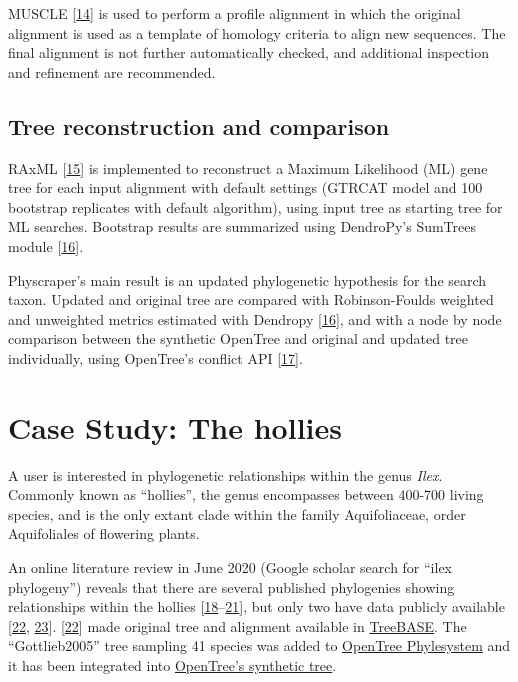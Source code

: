 \documentclass[]{article}
\begin{document}
MUSCLE {[}\protect\hyperlink{ref-edgar2004muscle}{14}{]} is used to perform a profile alignment in which the original alignment is used as a template of homology criteria to align new sequences.
The final alignment is not further automatically checked, and additional inspection and refinement are recommended.

\hypertarget{tree-reconstruction-and-comparison}{%
\subsection{Tree reconstruction and comparison}\label{tree-reconstruction-and-comparison}}

RAxML {[}\protect\hyperlink{ref-stamatakis2014raxml}{15}{]} is implemented to reconstruct a Maximum Likelihood (ML) gene tree for each input alignment with default settings (GTRCAT model and 100 bootstrap replicates with default algorithm), using input tree as starting tree for ML searches.
Bootstrap results are summarized using DendroPy's SumTrees module {[}\protect\hyperlink{ref-sukumaran2010dendropy}{16}{]}.

Physcraper's main result is an updated phylogenetic hypothesis for the search taxon.
Updated and original tree are compared with Robinson-Foulds weighted and unweighted metrics estimated with Dendropy {[}\protect\hyperlink{ref-sukumaran2010dendropy}{16}{]}, and with a node by node comparison between the synthetic OpenTree and original and updated tree individually, using OpenTree's conflict API {[}\protect\hyperlink{ref-redelings2017supertree}{17}{]}.

\hypertarget{case-study-the-hollies}{%
\section{Case Study: The hollies}\label{case-study-the-hollies}}

A user is interested in phylogenetic relationships within the genus \emph{Ilex}. Commonly known as ``hollies'', the genus encompasses between 400-700 living species, and is the only extant clade within the family Aquifoliaceae, order Aquifoliales of flowering plants.

An online literature review in June 2020 (Google scholar search for ``ilex phylogeny'') reveals that there are several published phylogenies showing relationships within the hollies {[}\protect\hyperlink{ref-cuenoud2000molecular}{18}--\protect\hyperlink{ref-selbach2009new}{21}{]}, but only two have data publicly available {[}\protect\hyperlink{ref-gottlieb2005molecular}{22}, \protect\hyperlink{ref-yao2020phylogeny}{23}{]}.
{[}\protect\hyperlink{ref-gottlieb2005molecular}{22}{]} made original tree and alignment available in \href{https://treebase.org/treebase-web/search/study/summary.html?id=1091}{TreeBASE}. The ``Gottlieb2005'' tree sampling 41 species was added to \href{https://tree.opentreeoflife.org/curator/study/edit/pg_2827/?tab=home}{OpenTree Phylesystem} and it has been integrated into \href{https://devtree.opentreeoflife.org/opentree/opentree12.3@mrcaott68451ott89474/Ilex-theizans--Ilex-dumosa}{OpenTree's synthetic tree}.
\end{document}
